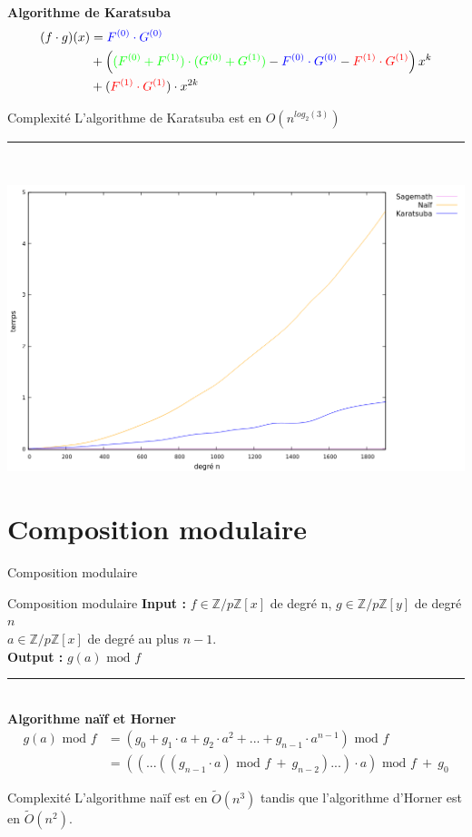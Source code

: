 \documentclass[10pt,a4paper]{beamer}
\begin{document}
\begin{frame}
    \textbf{Algorithme de Karatsuba}
    \begin{align*}
        (f \cdot g)(x) &= \textcolor{blue}{F^{(0)} \cdot G^{(0)}}\\
            &+\left( \textcolor{green}{(F^{(0)}+F^{(1)}) \cdot (G^{(0)} + G^{(1)})} - \textcolor{blue}{F^{(0)} \cdot G^{(0)}} - \textcolor{red}{F^{(1)} \cdot G^{(1)}} \right)x^k\\
            &+ (\textcolor{red}{F^{(1)} \cdot G^{(1)}}) \cdot x^{2k} 
    \end{align*}

    \begin{alertblock}{Complexité}
        L'algorithme de Karatsuba est en $O(n^{log_2(3)})$
    \end{alertblock}
    \rule{\linewidth}{0.2mm}\\[0.5cm]

    
\end{frame}
    \includegraphics[width=0.5\linewidth]{multi.png}
\begin{frame}

\end{frame}

\section{Composition modulaire}
\begin{frame}{Composition modulaire}
    \begin{block}{Composition modulaire}
        \textbf{Input :} $f \in \mathbb{Z}/p\mathbb{Z}[x]$ de degré n, $g \in \mathbb{Z}/p\mathbb{Z}[y]$ de degré $n$ \\ $a \in \mathbb{Z}/p\mathbb{Z}[x]$ de degré au plus $n-1$. \\
        \textbf{Output :} $g(a)\text{ mod }f$
    \end{block}
    \rule{\linewidth}{0.2mm}\\[0.5cm]
    
    \textbf{Algorithme naïf et Horner}
    \begin{align*} 
        g(a) \text{ mod }f &=(g_0+g_1\cdot a+g_2\cdot a^2+...+g_{n-1}\cdot a^{n-1}) \text{ mod } f \\
            &= ((...((g_{n-1}\cdot a)\text{ mod }f\ +\ g_{n-2})...)\cdot a)\text{ mod }f\ +\ g_0
    \end{align*}

    \begin{alertblock}{Complexité}
        L'algorithme naïf est en $\tilde{O}(n^3)$ tandis que l'algorithme d'Horner est en $\tilde{O}(n^2)$.
    \end{alertblock}
\end{frame}
\end{document}
